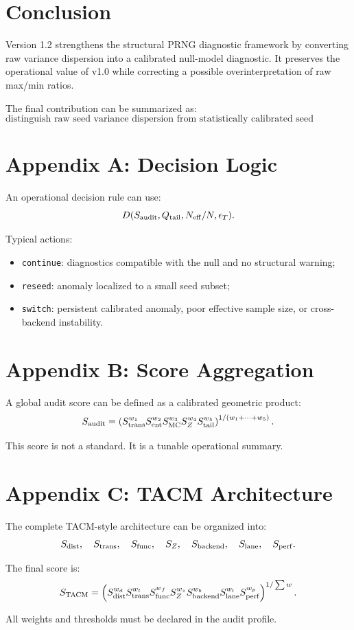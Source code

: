 \documentclass[11pt,a4paper]{article}
\newcommand{\Neff}{N_{\mathrm{eff}}}
\newcommand{\qtail}{Q_{\mathrm{tail}}}
\begin{document}
\section{Conclusion}

Version 1.2 strengthens the structural PRNG diagnostic framework by converting raw variance dispersion into a calibrated null-model diagnostic. It preserves the operational value of v1.0 while correcting a possible overinterpretation of raw max/min ratios.

The final contribution can be summarized as:
\[
\boxed{
\text{distinguish raw seed variance dispersion from statistically calibrated seed instability.}
}
\]

\appendix

\section{Appendix A: Decision Logic}

An operational decision rule can use:
\[
D(S_{\rm audit},\qtail,\Neff/N,\epsilon_T).
\]

Typical actions:
\begin{itemize}
  \item \texttt{continue}: diagnostics compatible with the null and no structural warning;
  \item \texttt{reseed}: anomaly localized to a small seed subset;
  \item \texttt{switch}: persistent calibrated anomaly, poor effective sample size, or cross-backend instability.
\end{itemize}

\section{Appendix B: Score Aggregation}

A global audit score can be defined as a calibrated geometric product:
\[
S_{\rm audit}
=
\left(
S_{\rm trans}^{w_1}
S_{\rm ent}^{w_2}
S_{\rm MC}^{w_3}
S_Z^{w_4}
S_{\rm tail}^{w_5}
\right)^{
1/(w_1+\cdots+w_5)
}.
\]

This score is not a standard. It is a tunable operational summary.

\section{Appendix C: TACM Architecture}

The complete TACM-style architecture can be organized into:
\[
S_{\rm dist},\quad
S_{\rm trans},\quad
S_{\rm func},\quad
S_Z,\quad
S_{\rm backend},\quad
S_{\rm lane},\quad
S_{\rm perf}.
\]

The final score is:
\[
S_{\rm TACM}
=
\left(
S_{\rm dist}^{w_d}
S_{\rm trans}^{w_t}
S_{\rm func}^{w_f}
S_Z^{w_z}
S_{\rm backend}^{w_b}
S_{\rm lane}^{w_l}
S_{\rm perf}^{w_p}
\right)^{
1/\sum w
}.
\]

All weights and thresholds must be declared in the audit profile.
\end{document}
